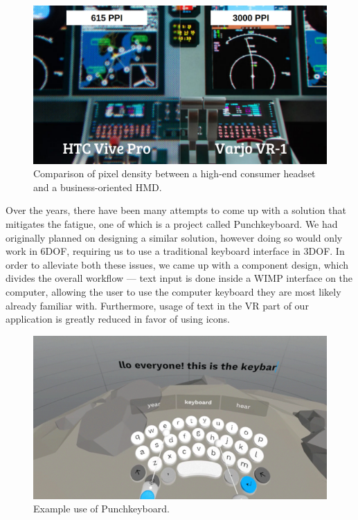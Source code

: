 \documentclass[thesis=M,english,hidelinks]{FITthesisXE}[2012/06/26]
\begin{document}
\begin{figure}[ht]
\centering
\includegraphics[scale=0.2]{pixel_density}
\caption{Comparison of pixel density between a high-end consumer headset and a business-oriented HMD.\autocite{varjocomparison}}
\label{fig:pixel_density}
\end{figure}

Over the years, there have been many attempts to come up with a solution that mitigates the fatigue, one of which is a project called Punchkeyboard.\autocite{punchkeyboard} We had originally planned on designing a similar solution, however doing so would only work in 6DOF, requiring us to use a traditional keyboard interface in 3DOF. In order to alleviate both these issues, we came up with a component design, which divides the overall workflow --- text input is done inside a WIMP interface on the computer, allowing the user to use the computer keyboard they are most likely already familiar with. Furthermore, usage of text in the VR part of our application is greatly reduced in favor of using icons.

\begin{figure}[ht]
\centering
\includegraphics[scale=0.4]{punch_keyboard}
\caption{Example use of Punchkeyboard.\autocite{punchkeyboard}}
\label{fig:punch_keyboard}
\end{figure}
\end{document}
